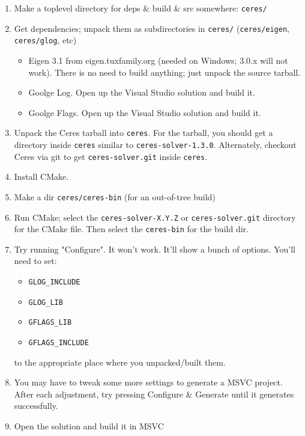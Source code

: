 \begin{enumerate}
  \item Make a toplevel directory for deps \& build \& src somewhere: \texttt{ceres/}
  \item Get dependencies; unpack them as subdirectories in \texttt{ceres/}
        (\texttt{ceres/eigen}, \texttt{ceres/glog}, etc)
        \begin{itemize}
          \item Eigen 3.1 from eigen.tuxfamily.org (needed on Windows; 3.0.x will not
                work). There is no need to build anything; just unpack the source
                tarball.
          \item Goolge Log. Open up the Visual Studio solution and build it.
          \item Goolge Flags. Open up the Visual Studio solution and build it.
        \end{itemize}
  \item Unpack the Ceres tarball into \texttt{ceres}. For the tarball, you
        should get a directory inside \texttt{ceres} similar to
        \texttt{ceres-solver-1.3.0}. Alternately, checkout Ceres via git to get
        \texttt{ceres-solver.git} inside \texttt{ceres}.
  \item Install CMake.
  \item Make a dir \texttt{ceres/ceres-bin} (for an out-of-tree build)
  \item Run CMake; select the \texttt{ceres-solver-X.Y.Z} or
        \texttt{ceres-solver.git} directory for the CMake file. Then select the
        \texttt{ceres-bin} for the build dir.
  \item Try running "Configure". It won't work. It'll show a bunch of options.
        You'll need to set:
        \begin{itemize}
        \item \texttt{GLOG\_INCLUDE}
        \item \texttt{GLOG\_LIB}
        \item \texttt{GFLAGS\_LIB}
        \item \texttt{GFLAGS\_INCLUDE}
        \end{itemize}
        to the appropriate place where you unpacked/built them.
  \item You may have to tweak some more settings to generate a MSVC project.
        After each adjustment, try pressing Configure \& Generate until it
        generates successfully.
  \item Open the solution and build it in MSVC
\end{enumerate}

